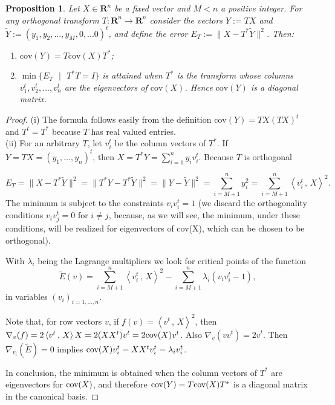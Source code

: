 \documentclass[11pt]{amsart}
\newtheorem{proposition}[theorem]{Proposition}
\theoremstyle{definition}
\theoremstyle{remark}
\numberwithin{equation}{section}
\newcommand{\ip}[2]{\left\langle #1\, , \,#2\right\rangle}
\begin{document}
\begin{proposition} Let $X\in\mathbf{R}^n$ be a  fixed vector and $M< n$ a positive integer. For any orthogonal transform $T:\mathbf{R}^n\to\mathbf{R}^n$ consider the vectors $Y:=TX$ and $\tilde{Y}:=(y_1,y_2,...,y_M, 0,...0)^t$,  and define the error   $E_T:=\|X-T^*\tilde{Y}\|^2$. Then:
\begin{enumerate}
	\item $\text{cov}(Y)=T\text{cov}(X)T^*$;
	\item $\min\{ E_T \text{ }| \text{ } T^*T=I \}$ is attained when $T^*$ is the transform whose columns   $v_1^t, v_2^t, ..., v_n^t$  are the eigenvectors of $\text{cov}(X)$. Hence $\text{cov}(Y)$ is a diagonal matrix.
\end{enumerate}
\end{proposition}


\begin{proof} (i) The formula follows easily from the definition $\text{cov}(Y)=TX(TX)^t$ and $T^t=T^* $ because $T$ has real valued entries. \\



(ii) For an arbitrary $T$, let $v_i^t$ be the column vectors of $T^*$. If $Y=TX=(y_1,\dots,y_n)^t$, then $X=T^*Y=\sum_{i=1}^ny_iv_i^t$. Because $T$ is orthogonal

$$E_T=\|X-T^*\tilde Y\|^2=\|T^*Y-T^*\tilde Y\|^2=\|Y-\tilde Y\|^2=\sum_{i=M+1}^ny_i^2=\sum_{i=M+1}^n\ip{v_i^t}{X}^2.$$
The minimum is subject to the constraints $v_iv_i^t=1$ (we discard the orthogonality conditions $v_iv_j^t=0$ for $i\neq j$, because, as we will see, the minimum, under these conditions, will be realized for eigenvectors of cov(X), which can be chosen to be orthogonal).

With $\lambda_i$ being the Lagrange multipliers we look for critical points of the function
$$\tilde E(v)=\sum_{i=M+1}^n\ip{v_i^t}{X}^2-\sum_{i=M+1}^n\lambda_i(v_iv_i^t-1),$$
in variables $(v_i)_{i=1,\dots,n}$.

Note that, for row vectors $v$, if $f(v)=\ip{v^t}{X}^2$, then $\nabla_v(f)=2\ip{v^t}{X}X=2(XX^t)v^t=2\textup{cov}(X)v^t$. Also $\nabla_v (vv^t)=2v^t$. Then $\nabla_{v_i}(\tilde E)=0$ implies $\textup{cov}(X)v_i^t=XX^tv_i^t=\lambda_i v_i^t$.

In conclusion, the minimum is obtained when the column vectors of $T^*$ are eigenvectors for $\textup{cov}(X)$, and therefore $\textup{cov}(Y)=T\textup{cov}(X)T^*$ is a diagonal matrix in the canonical basis.
\end{proof}
\end{document}
